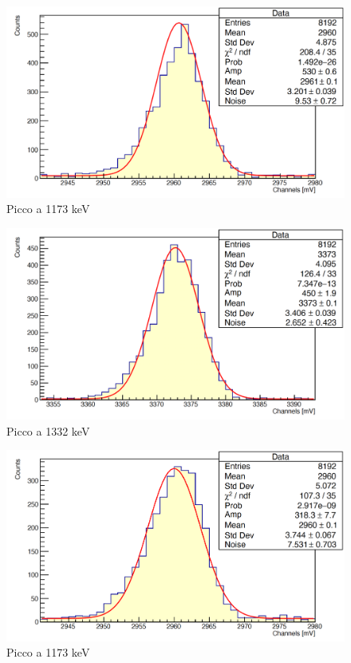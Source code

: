 \documentclass[a4paper,10pt]{article}
\begin{document}
\begin{figure}[H]
    \centering
    \includegraphics[scale=0.45]{appendice/spettri/CoA1_16}
    \caption{Picco a 1173 keV}
\end{figure}
\begin{figure}[H]
    \centering
    \includegraphics[scale=0.45]{appendice/spettri/CoA2_16}
    \caption{Picco a 1332 keV}
\end{figure}
\begin{figure}[H]
    \centering
    \includegraphics[scale=0.45]{appendice/spettri/CoA1_20}
    \caption{Picco a 1173 keV}
\end{figure}
\end{document}
